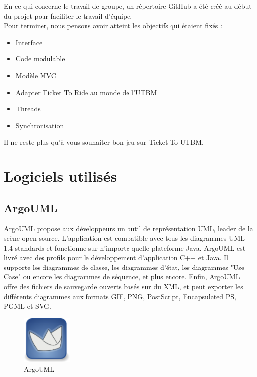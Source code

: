 \documentclass{report}
\begin{document}
En ce qui concerne le travail de groupe, un répertoire GitHub a été créé au début du projet pour faciliter le travail d'équipe.\\


Pour terminer, nous pensons avoir atteint les objectifs qui étaient fixés : 
\begin{itemize}
\item Interface
\item Code modulable
\item Modèle MVC
\item Adapter Ticket To Ride au monde de l'UTBM
\item Threads
\item Synchronisation\\
\end{itemize}


Il ne reste plus qu'à vous souhaiter bon jeu sur Ticket To UTBM.

\chapter{Logiciels utilisés}
\section{ArgoUML}
ArgoUML propose aux développeurs un outil de représentation UML, leader de la scène open source. L'application est compatible avec tous les diagrammes UML 1.4 standards et fonctionne sur n'importe quelle plateforme Java. ArgoUML est livré avec des profils pour le développement d'application C++ et Java. Il supporte les diagrammes de classe, les diagrammes d'état, les diagrammes "Use Case" ou encore les diagrammes de séquence, et plus encore. Enfin, ArgoUML offre des fichiers de sauvegarde ouverts basés sur du XML, et peut exporter les différents diagrammes aux formats GIF, PNG, PostScript, Encapsulated PS, PGML et SVG.
\begin{figure}[H]
\center
\includegraphics[width=70pt]{argoUML.png}
\caption{ArgoUML}
\label{ArgoUML}
\end{figure}
\end{document}
